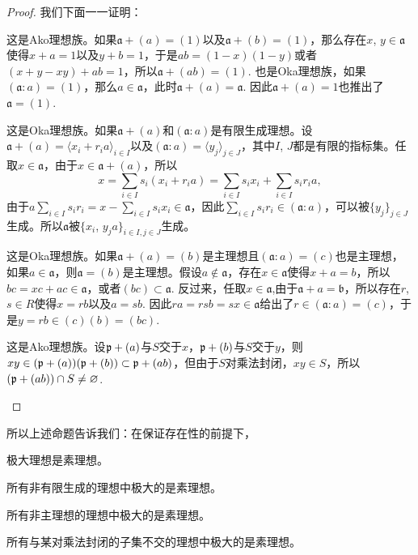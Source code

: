 \begin{proof}
	我们下面一一证明：
	\begin{compactenum}
	\item 这是Ako理想族。如果$\mathfrak{a}+(a)=(1)$以及$\mathfrak{a}+(b)=(1)$，那么存在$x$, $y\in \mathfrak{a}$使得$x+a=1$以及$y+b=1$，于是$ab=(1-x)(1-y)$或者$(x+y-xy)+ab=1$，所以$\mathfrak{a}+(ab)=(1)$. 也是Oka理想族，如果$(\mathfrak{a}:a)=(1)$，那么$a\in \mathfrak{a}$，此时$\mathfrak{a}+(a)=\mathfrak{a}$. 因此$\mathfrak{a}+(a)=1$也推出了$\mathfrak{a}=(1)$.

	\item 这是Oka理想族。如果$\mathfrak{a}+(a)$和$(\mathfrak{a}:a)$是有限生成理想。设$\mathfrak{a}+(a)=\langle x_i+r_ia \rangle_{i\in I}$以及$(\mathfrak{a}:a)=\langle y_j\rangle_{j\in J}$，其中$I$, $J$都是有限的指标集。任取$x\in \mathfrak{a}$，由于$x\in \mathfrak{a}+(a)$，所以
	\[
		x= \sum_{i\in I}s_i(x_i+r_ia)=\sum_{i\in I}s_ix_i+\sum_{i\in I}s_ir_ia,
	\]
	由于$a\sum_{i\in I}s_ir_i=x-\sum_{i\in I}s_ix_i\in \mathfrak{a}$，因此$\sum_{i\in I}s_ir_i\in (\mathfrak{a}:a)$，可以被$\{y_j\}_{j\in J}$生成。所以$\mathfrak{a}$被$\{x_i$, $y_ja\}_{i\in I,j\in J}$生成。

	\item 这是Oka理想族。如果$\mathfrak{a}+(a)=(b)$是主理想且$(\mathfrak{a}:a)=(c)$也是主理想，如果$a\in \mathfrak{a}$，则$\mathfrak{a}=(b)$是主理想。假设$a\not\in\mathfrak{a}$，存在$x\in \mathfrak{a}$使得$x+a=b$，所以$bc=xc+ac\in \mathfrak{a}$，或者$(bc)\subset \mathfrak{a}$. 反过来，任取$x\in \mathfrak{a}$,由于$\mathfrak{a}+a=\mathfrak{b}$，所以存在$r$, $s\in R$使得$x=rb$以及$a=sb$. 因此$ra=rsb=sx\in\mathfrak{a}$给出了$r\in (\mathfrak{a}:a)=(c)$，于是$y=rb\in (c)(b)=(bc)$.

	\item 这是Ako理想族。设$\mathfrak{p}+(a)$与$S$交于$x$，$\mathfrak{p}+(b)$与$S$交于$y$，则$xy\in (\mathfrak{p}+(a))(\mathfrak{p}+(b))\subset \mathfrak{p}+(ab)$，但由于$S$对乘法封闭，$xy\in S$，所以$(\mathfrak{p}+(ab))\cap S\neq \varnothing$. \qedhere
	\end{compactenum}
\end{proof}

所以上述命题告诉我们：在保证存在性的前提下，
\begin{compactenum}[~~~1.]
\item 极大理想是素理想。
\item 所有非有限生成的理想中极大的是素理想。
\item 所有非主理想的理想中极大的是素理想。
\item 所有与某对乘法封闭的子集不交的理想中极大的是素理想。
\end{compactenum}

